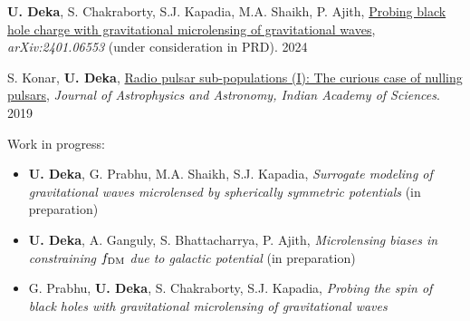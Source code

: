 \begin{itemize}[noitemsep]
{
\item \textbf{U. Deka}, S. Chakraborty, S.J. Kapadia, M.A. Shaikh, P. Ajith, \href{https://arxiv.org/pdf/2401.06553}{Probing black hole charge with gravitational microlensing of gravitational waves}, \textit{arXiv:2401.06553} (under consideration in PRD). \hfill  2024
    
\item S. Konar, \textbf{U. Deka}, \href{https://www.ias.ac.in/article/fulltext/joaa/040/05/0042}{Radio pulsar sub-populations (I): The curious case of nulling pulsars}, \textit{Journal of Astrophysics and Astronomy, Indian Academy of Sciences}. \hfill 2019

\item Work in progress:
    \begin{itemize}
    \item\textbf{U. Deka}, G. Prabhu, M.A. Shaikh, S.J. Kapadia, \textit{Surrogate modeling of gravitational waves microlensed by spherically symmetric potentials} (in preparation)
    \item\textbf{U. Deka}, A. Ganguly, S. Bhattacharrya, P. Ajith, \textit{Microlensing biases in constraining $f_{\rm DM}$ due to galactic potential} (in preparation)
    \item G. Prabhu, \textbf{U. Deka}, S. Chakraborty, S.J. Kapadia, \textit{Probing the spin of black holes with gravitational microlensing of gravitational waves}
    \end{itemize}
}\end{itemize}
